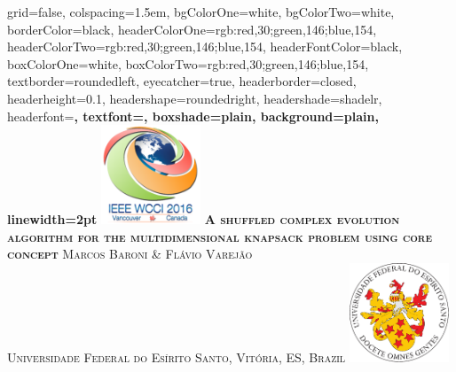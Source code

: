 \documentclass[landscape,final,a0paper,fontscale=0.38]{baposter}
\begin{document}
\begin{poster}%
  {
  grid=false,
  colspacing=1.5em,
  bgColorOne=white,
  bgColorTwo=white,
  borderColor=black,
  headerColorOne={rgb:red,30;green,146;blue,154},
  headerColorTwo={rgb:red,30;green,146;blue,154},
  headerFontColor=black,
  boxColorOne=white,
  boxColorTwo={rgb:red,30;green,146;blue,154},
  textborder=roundedleft,
  eyecatcher=true,
  headerborder=closed,
  headerheight=0.1\textheight,
  headershape=roundedright,
  headershade=shadelr,
  headerfont=\Large\bf\textsc, %
  textfont={\setlength{\parindent}{1.5em}},
  boxshade=plain,
  background=plain,
  linewidth=2pt
  }
  {\includegraphics[height=8em]{imgs/wcci-logo}} 
  {\bf\textsc{\LARGE \fontsize{20pt}{0.5cm}\selectfont A shuffled complex evolution algorithm for
the multidimensional knapsack problem using core concept}\vspace{0.3em}}
{\textsc{Marcos Baroni \& Flávio Varejão \\ \vspace{0.1em} {\large Universidade Federal do Es\'irito Santo, Vit\'oria, ES, Brazil} }}
  {%
    \includegraphics[height=8.0em]{../../brasao-ufes}
  }

    \newcommand{\colouredcircle}{%
      \tikz{\useasboundingbox (-0.2em,-0.32em) rectangle(0.2em,0.32em); \draw[draw=black,fill=lightblue,line width=0.03em] (0,0) circle(0.18em);}}


\end{poster}
\end{document}
